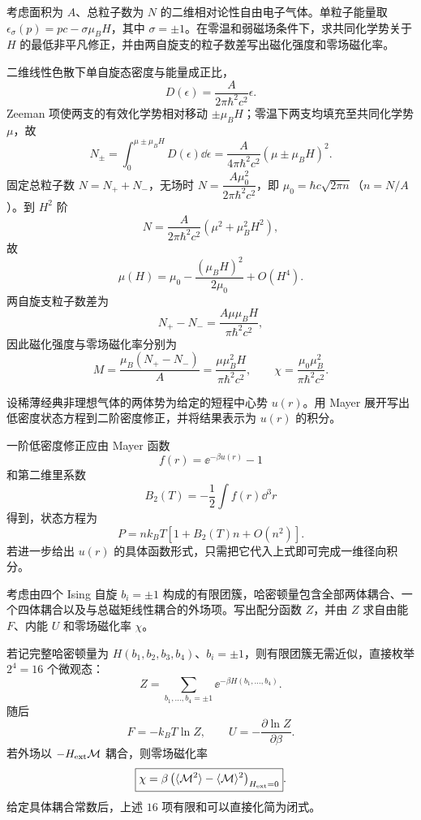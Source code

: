 \begin{question}
考虑面积为 $A$、总粒子数为 $N$ 的二维相对论性自由电子气体。单粒子能量取 $\epsilon_\sigma(p)=pc-\sigma\mu_BH$，其中 $\sigma=\pm1$。在零温和弱磁场条件下，求共同化学势关于 $H$ 的最低非平凡修正，并由两自旋支的粒子数差写出磁化强度和零场磁化率。
\begin{solution}
二维线性色散下单自旋态密度与能量成正比，
\[
D(\epsilon)=\frac{A}{2\pi\hbar^2c^2}\epsilon.
\]
Zeeman 项使两支的有效化学势相对移动 $\pm\mu_BH$；零温下两支均填充至共同化学势 $\mu$，故
\[
N_\pm=\int_0^{\mu\pm\mu_BH}D(\epsilon)\dd{\epsilon}
=\frac{A}{4\pi\hbar^2c^2}(\mu\pm\mu_BH)^2.
\]
固定总粒子数 $N=N_++N_-$，无场时 $N=\dfrac{A\mu_0^2}{2\pi\hbar^2c^2}$，即 $\mu_0=\hbar c\sqrt{2\pi n}$（$n=N/A$）。到 $H^2$ 阶
\[
N=\frac{A}{2\pi\hbar^2c^2}(\mu^2+\mu_B^2H^2),
\]
故
\[
\boxed{\mu(H)=\mu_0-\frac{(\mu_BH)^2}{2\mu_0}+O(H^4)}.
\]
两自旋支粒子数差为
\[
N_+-N_-=\frac{A\mu\mu_BH}{\pi\hbar^2c^2},
\]
因此磁化强度与零场磁化率分别为
\[
\boxed{M=\frac{\mu_B(N_+-N_-)}{A}
=\frac{\mu\mu_B^2H}{\pi\hbar^2c^2}},
\qquad
\boxed{\chi=\frac{\mu_0\mu_B^2}{\pi\hbar^2c^2}}.
\]
\end{solution}
\end{question}

\begin{question}
设稀薄经典非理想气体的两体势为给定的短程中心势 $u(r)$。用 Mayer 展开写出低密度状态方程到二阶密度修正，并将结果表示为 $u(r)$ 的积分。
\begin{solution}
一阶低密度修正应由 Mayer 函数
\[f(r)=\ee^{-\beta u(r)}-1\]
和第二维里系数
\[B_2(T)=-\frac12\int f(r)\dd^3r\]
得到，状态方程为
\[P=nk_BT[1+B_2(T)n+O(n^2)].\]
若进一步给出 $u(r)$ 的具体函数形式，只需把它代入上式即可完成一维径向积分。
\end{solution}
\end{question}

\begin{question}
考虑由四个 Ising 自旋 $b_i=\pm1$ 构成的有限团簇，哈密顿量包含全部两体耦合、一个四体耦合以及与总磁矩线性耦合的外场项。写出配分函数 $Z$，并由 $Z$ 求自由能 $F$、内能 $U$ 和零场磁化率 $\chi$。
\begin{solution}
若记完整哈密顿量为 $H(b_1,b_2,b_3,b_4)$、$b_i=\pm1$，则有限团簇无需近似，直接枚举 $2^4=16$ 个微观态：
\[\boxed{Z=\sum_{b_1,\ldots,b_4=\pm1}\ee^{-\beta H(b_1,\ldots,b_4)}}.\]
随后
\[\boxed{F=-k_BT\ln Z},\qquad \boxed{U=-\frac{\partial\ln Z}{\partial\beta}}.\]
若外场以 $-H_{\rm ext}\mathcal M$ 耦合，则零场磁化率
\[\boxed{\chi=\beta\left(\langle\mathcal M^2\rangle-\langle\mathcal M\rangle^2\right)_{H_{\rm ext}=0}}.\]
给定具体耦合常数后，上述 $16$ 项有限和可以直接化简为闭式。
\end{solution}
\end{question}
